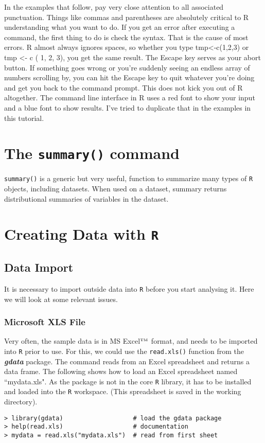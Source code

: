 \documentclass[a4paper,12pt]{article}
\begin{document}
In the examples that follow, pay very close attention to all associated punctuation. Things like commas and parentheses are absolutely critical to R understanding what you want to do. If you get an error after executing a command, the first thing to do is check the syntax. That is the cause of most errors. R almost always ignores spaces, so whether you type tmp<-c(1,2,3) or tmp <- c ( 1, 2, 3), you get the same result. 
The Escape key serves as your abort button. If something goes wrong or you're suddenly seeing an endless array of numbers scrolling by, you can hit the Escape key to quit whatever you're doing and get you back to the command prompt. This does not kick you out of R altogether. 
The command line interface in R uses a red font to show your input and a blue font to show results. I've tried to duplicate that in the examples in this tutorial. 

\section{The \texttt{summary()} command}
\texttt{summary()} is a generic but very useful, function to summarize many types of \texttt{R} objects, including datasets. When used on a dataset, summary returns distributional summaries of variables in the dataset.

\section{Creating Data with \texttt{R}}

\subsection{Data Import}
It is necessary to import outside data into \texttt{R} before you start analysing it. Here we will look at some relevant issues.

\subsubsection{Microsoft XLS File}
Very often, the sample data is in MS Excel$^{\mbox{\tiny{TM}}}$ format, and needs to be imported into \texttt{R} prior to use. For this, we could use the \texttt{read.xls()} function from the \textbf{\textit{gdata}} package. The command reads from an Excel spreadsheet and returns a data frame. The following shows how to load an Excel spreadsheet named ``mydata.xls". As the package is not in the core \texttt{R} library, it has to be installed and loaded into the \texttt{R} workspace. (This spreadsheet is saved in the working directory).
\begin{verbatim}
> library(gdata)                   # load the gdata package
> help(read.xls)                   # documentation
> mydata = read.xls("mydata.xls")  # read from first sheet
\end{verbatim}
\end{document}
